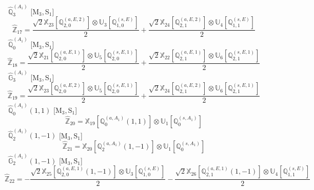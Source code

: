 \documentclass[fleqn,10pt,landscape]{article}
\begin{document}
\begin{itemize}
\noindent {} $\,\,\,\hat{\mathbb{Q}}_{3}^{(A_{1})}$ [M$_{3}$,\,S$_{1}$]
\begin{dmath*}
\hat{\mathbb{Z}}_{17}=\frac{\sqrt{2} \mathbb{X}_{23}[\mathbb{Q}_{2,0}^{(a,E,2)}] \otimes\mathbb{U}_{3}[\mathbb{Q}_{1,0}^{(s,E)}]}{2} + \frac{\sqrt{2} \mathbb{X}_{24}[\mathbb{Q}_{2,1}^{(a,E,2)}] \otimes\mathbb{U}_{4}[\mathbb{Q}_{1,1}^{(s,E)}]}{2}
\end{dmath*}
\vspace{4mm}
\noindent {} $\,\,\,\hat{\mathbb{Q}}_{0}^{(A_{1})}$ [M$_{3}$,\,S$_{1}$]
\begin{dmath*}
\hat{\mathbb{Z}}_{18}=\frac{\sqrt{2} \mathbb{X}_{21}[\mathbb{Q}_{2,0}^{(a,E,1)}] \otimes\mathbb{U}_{5}[\mathbb{Q}_{2,0}^{(s,E,1)}]}{2} + \frac{\sqrt{2} \mathbb{X}_{22}[\mathbb{Q}_{2,1}^{(a,E,1)}] \otimes\mathbb{U}_{6}[\mathbb{Q}_{2,1}^{(s,E,1)}]}{2}
\end{dmath*}
\vspace{4mm}
\noindent {} $\,\,\,\hat{\mathbb{G}}_{3}^{(A_{1})}$ [M$_{3}$,\,S$_{1}$]
\begin{dmath*}
\hat{\mathbb{Z}}_{19}=\frac{\sqrt{2} \mathbb{X}_{23}[\mathbb{Q}_{2,0}^{(a,E,2)}] \otimes\mathbb{U}_{5}[\mathbb{Q}_{2,0}^{(s,E,1)}]}{2} + \frac{\sqrt{2} \mathbb{X}_{24}[\mathbb{Q}_{2,1}^{(a,E,2)}] \otimes\mathbb{U}_{6}[\mathbb{Q}_{2,1}^{(s,E,1)}]}{2}
\end{dmath*}
\vspace{4mm}
\noindent {} $\,\,\,\hat{\mathbb{Q}}_{0}^{(A_{1})}(1,1)$ [M$_{3}$,\,S$_{1}$]
\begin{dmath*}
\hat{\mathbb{Z}}_{20}=\mathbb{X}_{19}[\mathbb{Q}_{0}^{(a,A_{1})}(1,1)] \otimes\mathbb{U}_{1}[\mathbb{Q}_{0}^{(s,A_{1})}]
\end{dmath*}
\vspace{4mm}
\noindent {} $\,\,\,\hat{\mathbb{Q}}_{2}^{(A_{1})}(1,-1)$ [M$_{3}$,\,S$_{1}$]
\begin{dmath*}
\hat{\mathbb{Z}}_{21}=\mathbb{X}_{20}[\mathbb{Q}_{2}^{(a,A_{1})}(1,-1)] \otimes\mathbb{U}_{1}[\mathbb{Q}_{0}^{(s,A_{1})}]
\end{dmath*}
\vspace{4mm}
\noindent {} $\,\,\,\hat{\mathbb{G}}_{2}^{(A_{1})}(1,-1)$ [M$_{3}$,\,S$_{1}$]
\begin{dmath*}
\hat{\mathbb{Z}}_{22}=- \frac{\sqrt{2} \mathbb{X}_{25}[\mathbb{Q}_{2,0}^{(a,E,1)}(1,-1)] \otimes\mathbb{U}_{3}[\mathbb{Q}_{1,0}^{(s,E)}]}{2} - \frac{\sqrt{2} \mathbb{X}_{26}[\mathbb{Q}_{2,1}^{(a,E,1)}(1,-1)] \otimes\mathbb{U}_{4}[\mathbb{Q}_{1,1}^{(s,E)}]}{2}

\end{dmath*}
\end{itemize}
\end{document}
